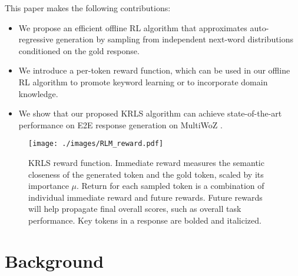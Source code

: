 This paper makes the following contributions:
\begin{itemize}
  \item We propose an efficient offline RL algorithm that approximates auto-regressive generation by sampling from independent next-word distributions conditioned on the gold response. 
	\item We introduce a per-token reward function, which can be used in our offline RL algorithm to promote keyword learning or to incorporate domain knowledge.
	\item We show that our proposed KRLS algorithm can achieve state-of-the-art performance on E2E response generation on MultiWoZ \cite{multiwoz,multiwoz2.1,multiwoz2.2}.
\end{itemize}

\begin{figure*}[!ht]
  \centering
  \texttt{[image: ./images/RLM\_reward.pdf]}
  \caption{KRLS reward function. Immediate reward measures the semantic closeness of the generated token and the gold token, scaled by its importance $\mu$. Return for each sampled token is a combination of individual immediate reward and future rewards. Future rewards will help propagate final overall scores, such as overall task performance. Key tokens in a response are bolded and italicized.}
  \label{fig:KRLS_reward}
\end{figure*}

\section{Background}
\label{sec:Background}

